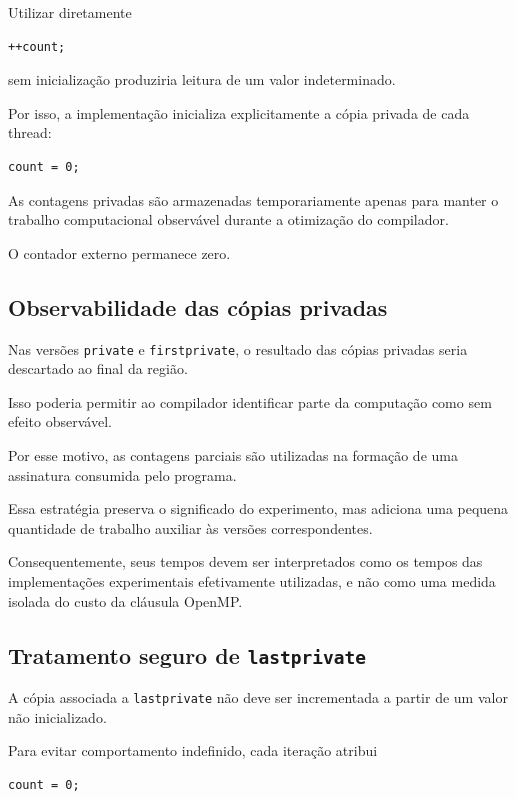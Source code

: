 Utilizar diretamente

\begin{verbatim}
++count;
\end{verbatim}

sem inicialização produziria leitura de um valor indeterminado.

Por isso, a implementação inicializa explicitamente a cópia privada de cada
thread:

\begin{verbatim}
count = 0;
\end{verbatim}

As contagens privadas são armazenadas temporariamente apenas para manter o
trabalho computacional observável durante a otimização do compilador.

O contador externo permanece zero.


\subsection{Observabilidade das cópias privadas}

Nas versões \texttt{private} e \texttt{firstprivate}, o resultado das cópias
privadas seria descartado ao final da região.

Isso poderia permitir ao compilador identificar parte da computação como
sem efeito observável.

Por esse motivo, as contagens parciais são utilizadas na formação de uma
assinatura consumida pelo programa.

Essa estratégia preserva o significado do experimento, mas adiciona uma
pequena quantidade de trabalho auxiliar às versões correspondentes.

Consequentemente, seus tempos devem ser interpretados como os tempos das
implementações experimentais efetivamente utilizadas, e não como uma
medida isolada do custo da cláusula OpenMP.


\subsection{Tratamento seguro de \texttt{lastprivate}}

A cópia associada a \texttt{lastprivate} não deve ser incrementada a partir
de um valor não inicializado.

Para evitar comportamento indefinido, cada iteração atribui

\begin{verbatim}
count = 0;
\end{verbatim}


